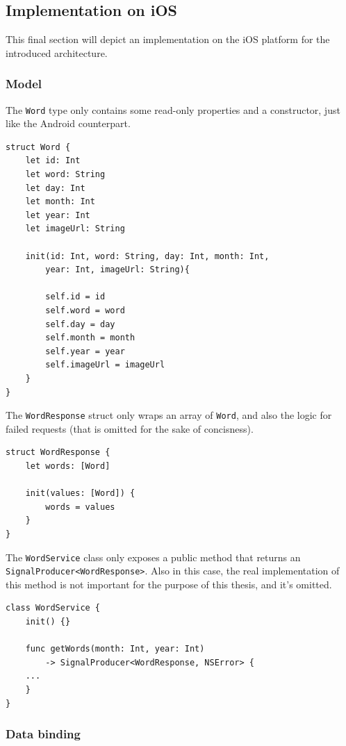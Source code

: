 \subsection{Implementation on iOS}\label{implementation-on-ios}

This final section will depict an implementation on the iOS platform
for the introduced architecture.

\subsubsection{Model}\label{model}

The \texttt{Word} type only contains some read-only properties and a
constructor, just like the Android counterpart.

\begin{verbatim}
struct Word {
    let id: Int
    let word: String
    let day: Int
    let month: Int
    let year: Int
    let imageUrl: String

    init(id: Int, word: String, day: Int, month: Int,
        year: Int, imageUrl: String){

        self.id = id
        self.word = word
        self.day = day
        self.month = month
        self.year = year
        self.imageUrl = imageUrl
    }
}
\end{verbatim}

The \texttt{WordResponse} struct only wraps an array of \texttt{Word},
and also the logic for failed requests (that is omitted for the sake of
concisness).

\begin{verbatim}
struct WordResponse {
    let words: [Word]

    init(values: [Word]) {
        words = values
    }
}
\end{verbatim}

The \texttt{WordService} class only exposes a public method that returns
an \texttt{SignalProducer\textless{}WordResponse\textgreater{}}. Also in
this case, the real implementation of this method is not important for
the purpose of this thesis, and it's omitted.

\begin{verbatim}
class WordService {
    init() {}

    func getWords(month: Int, year: Int)
        -> SignalProducer<WordResponse, NSError> {
    ...
    }
}
\end{verbatim}

\subsubsection{Data binding}\label{data-binding}

